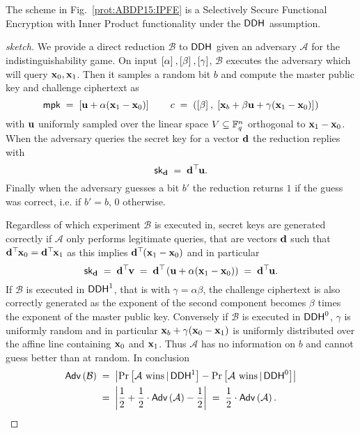 \begin{proposition}
	The scheme in Fig.~\ref{prot:ABDP15:IPFE} is a Selectively Secure Functional Encryption with Inner Product functionality under the $\ddh$ assumption. 
\end{proposition}
\begin{proof}[sketch]
	We provide a direct reduction $\mathcal{B}$ to $\ddh$ given an adversary $\mathcal{A}$ for the indistinguishability game.
	On input $\gexp{}{\alpha}, \gexp{}{\beta}, \gexp{}{\gamma}$, $\mathcal{B}$ executes the adversary which will query $\vc{x}_0, \vc{x}_1$. Then it samples a random bit $b$ and compute the master public key and challenge ciphertext as
	\[
		\mpk
			\; = \;
		\gexp{}{\vc{u} + \alpha(\vc{x}_1 - \vc{x}_0)}
			\qquad
		c
			\; = \;
		\left( \gexp{}{\beta}, \; \gexp{}{\vc{x}_b + \beta \vc{u} + \gamma(\vc{x}_1 - \vc{x}_0)} \right)
	\]
	with $\vc{u}$ uniformly sampled over the linear space $V \subseteq \F_q^n$ orthogonal to $\vc{x}_1 - \vc{x}_0$.
	When the adversary queries the secret key for a vector $\vc{d}$ the reduction replies with
	\[
		\sk_\vc{d}
			\; = \;
		\vc{d}^\trs \vc{u}.
	\]
	Finally when the adversary guesses a bit $b'$ the reduction returns $1$ if the guess was correct, i.e. if $b' = b$, $0$ otherwise.
	
	Regardless of which experiment $\mathcal{B}$ is executed in, secret keys are generated correctly if $\mathcal{A}$ only performs legitimate queries, that are vectors $\vc{d}$ such that $\vc{d}^\trs \vc{x}_0 = \vc{d}^\trs \vc{x}_1$ as this implies $\vc{d}^\trs(\vc{x}_1 - \vc{x}_0)$ and in particular
	\[
		\sk_\vc{d}	
			\; = \;
		\vc{d}^\trs \vc{v}
			\; = \;
		\vc{d}^\trs \left( \vc{u} + \alpha(\vc{x}_1 - \vc{x}_0) \right)
			\; = \;
		\vc{d}^\trs \vc{u}.
	\]
	If $\mathcal{B}$ is executed in $\ddh[1]$, that is with $\gamma = \alpha \beta$, the challenge ciphertext is also correctly generated as the exponent of the second component becomes $\beta$ times the exponent of the master public key.
	Conversely if $\mathcal{B}$ is executed in $\ddh[0]$, $\gamma$ is uniformly random and in particular $\vc{x}_b + \gamma(\vc{x}_0 - \vc{x}_1)$ is uniformly distributed over the affine line containing $\vc{x}_0$ and $\vc{x}_1$.
	Thus $\mathcal{A}$ has no information on $b$ and cannot guess better than at random.
	In conclusion
	\begin{align*}
		\adv{\mathcal{B}}
			\; &= \;
		\left| \prob{\mathcal{A} \text{ wins} \,|\, \ddh[1]} - \prob{\mathcal{A} \text{ wins} \,|\, \ddh[0]} \right|
			\\ &= \;
		\left| \frac{1}{2} + \frac{1}{2} \cdot \adv{\mathcal{A}} - \frac{1}{2} \right|
			\; = \;
		\frac{1}{2} \cdot \adv{\mathcal{A}}.
	\end{align*}
\end{proof}